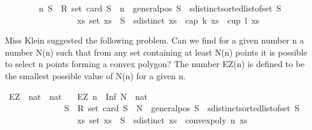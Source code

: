 \begin{isabellebody}
\ \ \ \ \ \ \ \ {\isacharbraceleft}{\kern0pt}n{\isachardot}{\kern0pt}\ {\isacharparenleft}{\kern0pt}{\isasymforall}S\ {\isacharcolon}{\kern0pt}{\isacharcolon}{\kern0pt}\ R{}\ set{\isachardot}{\kern0pt}\ {\isacharparenleft}{\kern0pt}card\ S\ {\isasymge}\ n\ {\isasymand}\ general{\isacharunderscore}{\kern0pt}pos\ S\ {\isasymand}\ sdistinct{\isacharparenleft}{\kern0pt}sorted{\isacharunderscore}{\kern0pt}list{\isacharunderscore}{\kern0pt}of{\isacharunderscore}{\kern0pt}set\ S{\isacharparenright}{\kern0pt}{\isacharparenright}{\kern0pt}\isanewline
\ \ \ \ \ \ \ \ \ \ \ \ \ \ \ \ {\isasymlongrightarrow}\ {\isacharparenleft}{\kern0pt}{\isasymexists}xs{\isachardot}{\kern0pt}\ set\ xs\ {\isasymsubseteq}\ S\ {\isasymand}\ sdistinct\ xs\ {\isasymand}\ {\isacharparenleft}{\kern0pt}cap\ k\ xs\ {\isasymor}\ cup\ l\ xs{\isacharparenright}{\kern0pt}{\isacharparenright}{\kern0pt}{\isacharparenright}{\kern0pt}{\isacharbraceright}{\kern0pt}{\isachardoublequoteclose}%
\begin{isamarkuptext}%
Miss Klein suggested the following problem. Can we find for a given number n a number N(n) such that from any set containing at least N(n) points it is possible to select n points forming a convex polygon? The number EZ(n) is defined to be the smallest possible value of N(n) for a given n.%
\end{isamarkuptext}\isamarkuptrue%
\isamarkupfalse%
\ EZ\ {\isacharcolon}{\kern0pt}{\isacharcolon}{\kern0pt}\ {\isachardoublequoteopen}nat\ {\isasymRightarrow}\ nat{\isachardoublequoteclose}\ \isanewline
\ \ {\isachardoublequoteopen}EZ\ n\ {\isacharequal}{\kern0pt}\ Inf\ {\isacharbraceleft}{\kern0pt}N\ {\isacharcolon}{\kern0pt}{\isacharcolon}{\kern0pt}\ nat{\isachardot}{\kern0pt}\ \isanewline
\ \ \ \ \ \ \ \ \ \ \ \ \ \ {\isacharparenleft}{\kern0pt}{\isasymforall}S\ {\isacharcolon}{\kern0pt}{\isacharcolon}{\kern0pt}\ R{}\ set{\isachardot}{\kern0pt}\ {\isacharparenleft}{\kern0pt}card\ S\ {\isasymge}\ N\ {\isasymand}\ general{\isacharunderscore}{\kern0pt}pos\ S\ {\isasymand}\ sdistinct{\isacharparenleft}{\kern0pt}sorted{\isacharunderscore}{\kern0pt}list{\isacharunderscore}{\kern0pt}of{\isacharunderscore}{\kern0pt}set\ S{\isacharparenright}{\kern0pt}{\isacharparenright}{\kern0pt}\isanewline
\ \ \ \ \ \ \ \ \ \ \ \ \ \ \ \ {\isasymlongrightarrow}\ {\isacharparenleft}{\kern0pt}{\isasymexists}xs{\isachardot}{\kern0pt}\ set\ xs\ {\isasymsubseteq}\ S\ {\isasymand}\ sdistinct\ xs\ {\isasymand}\ convex{\isacharunderscore}{\kern0pt}poly\ n\ xs{\isacharparenright}{\kern0pt}{\isacharparenright}{\kern0pt}{\isacharbraceright}{\kern0pt}{\isachardoublequoteclose}\isanewline
%
\isadelimtheory
\isanewline
%
\endisadelimtheory
%
\isatagtheory
{}\isamarkupfalse%
%
\endisatagtheory
{\isafoldtheory}%
%
\isadelimtheory
%
\endisadelimtheory
%
\end{isabellebody}%
